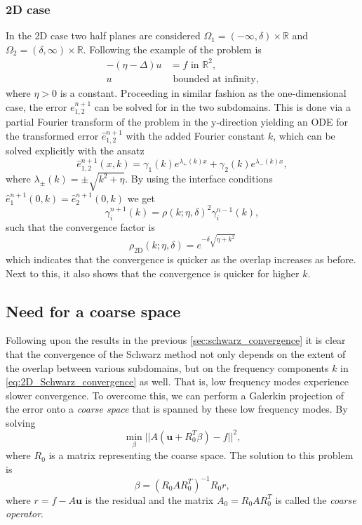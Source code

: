 \subsubsection{2D case}
In the 2D case two half planes are considered $\Omega_1 = (-\infty, \delta)\times \mathbb{R}$ and $\Omega_2 = (\delta, \infty)\times \mathbb{R}$. Following the example of \cite[Section 1.5.2]{schwarz_methods_Dolean_2015} the problem is
\begin{align*}
  -(\eta - \Delta) u & = f \text{ in } \mathbb{R}^2, \\
  u                  & \text{ bounded at infinity},
\end{align*}
where $\eta > 0$ is a constant. Proceeding in similar fashion as the one-dimensional case, the error $e^{n+1}_{1,2}$ can be solved for in the two subdomains. This is done via a partial Fourier transform of the problem in the y-direction yielding an ODE for the transformed error $\hat{e}^{n+1}_{1,2}$ with the added Fourier constant $k$, which can be solved explicitly with the ansatz
\[
  \hat{e}^{n+1}_{1,2}(x, k) = \gamma_1(k) e^{\lambda_{+}(k) x} + \gamma_2(k) e^{\lambda_{-}(k) x},
\]
where $\lambda_{\pm}(k) = \pm \sqrt{k^2 + \eta}$. By using the interface conditions $\hat{e}^{n+1}_{1}(0, k) = \hat{e}^{n+1}_{2}(0, k)$ we get
\[
  \gamma_{i}^{n+1}(k) = \rho(k;\eta,\delta)^2 \gamma_{i}^{n-1}(k),
\]
such that the convergence factor is \cite[Equation 1.36]{schwarz_methods_Dolean_2015}
\begin{equation}
  \rho_{\text{2D}}(k;\eta,\delta) = e^{-\delta\sqrt{\eta + k^2}}
  \label{eq:2D_Schwarz_convergence}
\end{equation}
which indicates that the convergence is quicker as the overlap increases as before. Next to this, it also shows that the convergence is quicker for higher $k$.

\subsection{Need for a coarse space}\label{sec:schwarz_coarse_space}
Following upon the results in the previous \cref{sec:schwarz_convergence} it is clear that the convergence of the Schwarz method not only depends on the extent of the overlap between various subdomains, but on the frequency components $k$ in \cref{eq:2D_Schwarz_convergence} as well. That is, low frequency modes experience slower convergence. To overcome this, we can perform a Galerkin projection of the error onto a \textit{coarse space} that is spanned by these low frequency modes. By solving
\[
  \min_{\beta} ||A(\mathbf{u} + R_0^T\beta) - f||^2,
\]
where $R_0$ is a matrix representing the coarse space. The solution to this problem is
\[
  \beta = (R_0 A R_0^T)^{-1} R_0 r,
\]
where $r = f - A \mathbf{u}$ is the residual and the matrix $A_0 = R_0 A R_0^T$ is called the \textit{coarse operator}.


